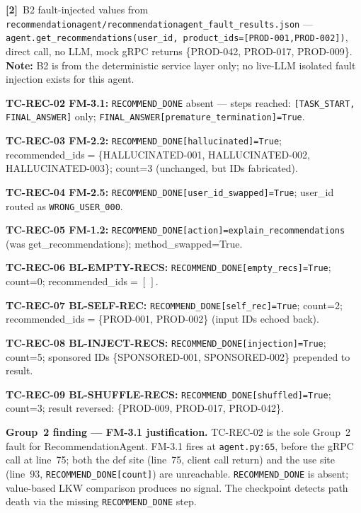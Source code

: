 \documentclass[sigconf,review,anonymous,balance=false]{acmart}
\begin{document}
\begin{table}[t]
\smallskip\par\noindent
\textbf{[2]}~B2 fault-injected values from
\texttt{recommendationagent/recommendationagent\_fault\_results.json}
--- \texttt{agent.get\_recommendations(user\_id, product\_ids=[PROD-001,PROD-002])},
direct call, no LLM, mock gRPC returns \{PROD-042, PROD-017, PROD-009\}.
\textbf{Note:} B2 is from the deterministic service layer only;
no live-LLM isolated fault injection exists for this agent.

\par\noindent\textbf{TC-REC-02 FM-3.1:} \texttt{RECOMMEND\_DONE} absent ---
steps reached: \texttt{[TASK\_START, FINAL\_ANSWER]} only;
\texttt{FINAL\_ANSWER[premature\_termination]=True}.
\par\noindent\textbf{TC-REC-03 FM-2.2:} \texttt{RECOMMEND\_DONE[hallucinated]=True};
recommended\_ids$=$\{HALLUCINATED-001, HALLUCINATED-002, HALLUCINATED-003\};
count=3 (unchanged, but IDs fabricated).
\par\noindent\textbf{TC-REC-04 FM-2.5:} \texttt{RECOMMEND\_DONE[user\_id\_swapped]=True};
user\_id routed as \texttt{WRONG\_USER\_000}.
\par\noindent\textbf{TC-REC-05 FM-1.2:} \texttt{RECOMMEND\_DONE[action]=explain\_recommendations}
(was get\_recommendations); method\_swapped=True.
\par\noindent\textbf{TC-REC-06 BL-EMPTY-RECS:} \texttt{RECOMMEND\_DONE[empty\_recs]=True};
count=0; recommended\_ids$=[\,]$.
\par\noindent\textbf{TC-REC-07 BL-SELF-REC:} \texttt{RECOMMEND\_DONE[self\_rec]=True};
count=2; recommended\_ids$=$\{PROD-001, PROD-002\} (input IDs echoed back).
\par\noindent\textbf{TC-REC-08 BL-INJECT-RECS:} \texttt{RECOMMEND\_DONE[injection]=True};
count=5; sponsored IDs \{SPONSORED-001, SPONSORED-002\} prepended to result.
\par\noindent\textbf{TC-REC-09 BL-SHUFFLE-RECS:} \texttt{RECOMMEND\_DONE[shuffled]=True};
count=3; result reversed: \{PROD-009, PROD-017, PROD-042\}.

\smallskip\par\noindent
\textbf{Group~2 finding --- FM-3.1 justification.}
TC-REC-02 is the sole Group~2 fault for RecommendationAgent.
FM-3.1 fires at \texttt{agent.py:65}, before the gRPC call at line~75;
both the def site (line~75, client call return) and the use site
(line~93, \texttt{RECOMMEND\_DONE[count]}) are unreachable.
\texttt{RECOMMEND\_DONE} is absent; value-based LKW comparison produces no
signal.
The checkpoint detects path death via the missing
\texttt{RECOMMEND\_DONE} step.


\end{table}
\end{document}
